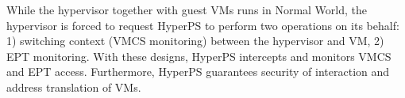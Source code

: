 ﻿\documentclass[conference]{IEEEtran}
\begin{document}
While the hypervisor together with guest VMs runs in Normal World, the hypervisor is forced to request HyperPS to perform two operations on its behalf: 1) switching context (VMCS monitoring) between the hypervisor and VM, 2) EPT monitoring. 
 With these designs, HyperPS intercepts and monitors VMCS and EPT access. Furthermore, HyperPS guarantees security of interaction and address translation of VMs.



%
%
%
%
\end{document}
